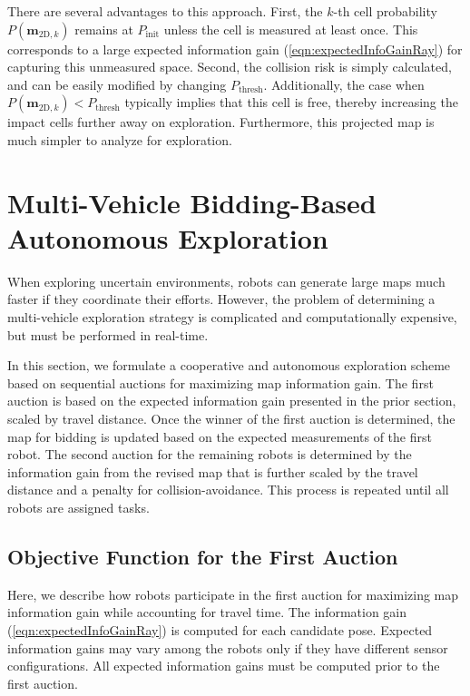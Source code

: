 \documentclass[smallextended]{svjour3}       %
\newcommand{\refeqn}[1]{(\ref{eqn:#1})}
\begin{document}
There are several advantages to this approach. First, the $k$-th cell probability $P(\mathbf{m}_{\text{2D},k})$ remains at $P_\text{init}$ unless the cell is measured at least once. This corresponds to a large expected information gain \refeqn{expectedInfoGainRay} for capturing this unmeasured space. Second, the collision risk is simply calculated, and can be easily modified by changing $P_\text{thresh}$. Additionally, the case when $P(\mathbf{m}_{\text{2D},k})<P_\text{thresh}$ typically implies that this cell is free, thereby increasing the impact cells further away on exploration. Furthermore, this projected map is much simpler to analyze for exploration.


\section{Multi-Vehicle Bidding-Based Autonomous Exploration}
\label{sec:BiddingExploration}

When exploring uncertain environments, robots can generate large maps much faster if they coordinate their efforts. However, the problem of determining a multi-vehicle exploration strategy is complicated and computationally expensive, but must be performed in real-time.

In this section, we formulate a cooperative and autonomous exploration scheme based on sequential auctions for maximizing map information gain. The first auction is based on the expected information gain presented in the prior section, scaled by travel distance. Once the winner of the first auction is determined, the map for bidding is updated based on the expected measurements of the first robot. The second auction for the remaining robots is determined by the information gain from the revised map that is further scaled by the travel distance and a penalty for collision-avoidance. This process is repeated until all robots are assigned tasks. 


\subsection{Objective Function for the First Auction}

Here, we describe how robots participate in the first auction for maximizing map information gain while accounting for travel time. The information gain \refeqn{expectedInfoGainRay} is computed for each candidate pose. Expected information gains may vary among the robots only if they have different sensor configurations. All expected information gains must be computed prior to the first auction.
\end{document}
